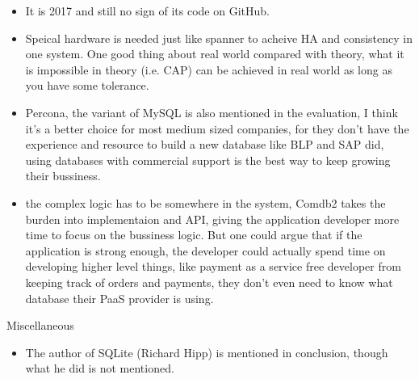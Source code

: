 \documentclass[12pt,a4paper,oneside]{article}
\begin{document}
\begin{itemize}
  \item It is 2017 and still no sign of its code on GitHub.
  \item Speical hardware is needed just like spanner to acheive HA and consistency in one system.
  One good thing about real world compared with theory, what it is impossible in theory (i.e. CAP) can be achieved in real world as long as you have some tolerance.
  \item Percona, the variant of MySQL is also mentioned in the evaluation, I think it's a better choice for most medium sized companies,
  for they don't have the experience and resource to build a new database like BLP and SAP did, using databases with commercial support
  is the best way to keep growing their bussiness.
  \item the complex logic has to be somewhere in the system, Comdb2 takes the burden into implementaion and API, giving the application
  developer more time to focus on the bussiness logic. But one could argue that if the application is strong enough, the developer could
  actually spend time on developing higher level things, like payment as a service free developer from keeping track of orders and payments,
  they don't even need to know what database their PaaS provider is using.
\end{itemize}

Miscellaneous

\begin{itemize}
  \item The author of SQLite (Richard Hipp) is mentioned in conclusion, though what he did is not mentioned.
\end{itemize}
\end{document}
